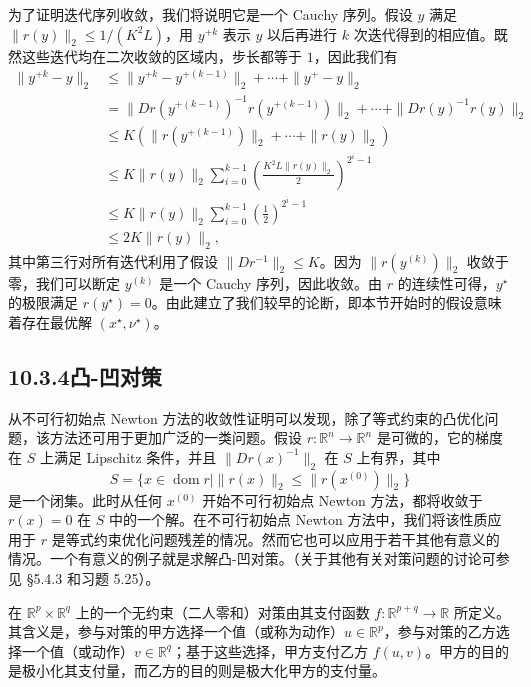 \documentclass[UTF8, 12pt, fontset=fandol, oneside]{ctexart}
\begin{document}
为了证明迭代序列收敛，我们将说明它是一个 Cauchy 序列。假设 $y$ 满足 $\|r(y)\|_2\leq 1/(K^2L)$，用 $y^{+k}$ 表示 $y$ 以后再进行 $k$ 次迭代得到的相应值。既然这些迭代均在二次收敛的区域内，步长都等于 $1$，因此我们有
\[
\begin{aligned}
\|y^{+k}-y\|_2
&\leq \|y^{+k}-y^{+(k-1)}\|_2+\cdots+\|y^+-y\|_2\\
&=\|Dr(y^{+(k-1)})^{-1}r(y^{+(k-1)})\|_2+\cdots+\|Dr(y)^{-1}r(y)\|_2\\
&\leq K\left(\|r(y^{+(k-1)})\|_2+\cdots+\|r(y)\|_2\right)\\
&\leq K\|r(y)\|_2\sum_{i=0}^{k-1}\left(\frac{K^2L\|r(y)\|_2}{2}\right)^{2^i-1}\\
&\leq K\|r(y)\|_2\sum_{i=0}^{k-1}\left(\frac{1}{2}\right)^{2^i-1}\\
&\leq 2K\|r(y)\|_2,
\end{aligned}
\]
其中第三行对所有迭代利用了假设 $\|Dr^{-1}\|_2\leq K$。因为 $\|r(y^{(k)})\|_2$ 收敛于零，我们可以断定 $y^{(k)}$ 是一个 Cauchy 序列，因此收敛。由 $r$ 的连续性可得，$y^\star$ 的极限满足 $r(y^\star)=0$。由此建立了我们较早的论断，即本节开始时的假设意味着存在最优解 $(x^\star,\nu^\star)$。

\subsection*{10.3.4\quad 凸-凹对策}

从不可行初始点 Newton 方法的收敛性证明可以发现，除了等式约束的凸优化问题，该方法还可用于更加广泛的一类问题。假设 $r:\mathbb{R}^n\to\mathbb{R}^n$ 是可微的，它的梯度在 $S$ 上满足 Lipschitz 条件，并且 $\|Dr(x)^{-1}\|_2$ 在 $S$ 上有界，其中
\[
S=\{x\in\operatorname{dom} r\mid \|r(x)\|_2\leq \|r(x^{(0)})\|_2\}
\]
是一个闭集。此时从任何 $x^{(0)}$ 开始不可行初始点 Newton 方法，都将收敛于 $r(x)=0$ 在 $S$ 中的一个解。在不可行初始点 Newton 方法中，我们将该性质应用于 $r$ 是等式约束优化问题残差的情况。然而它也可以应用于若干其他有意义的情况。一个有意义的例子就是求解凸-凹对策。（关于其他有关对策问题的讨论可参见 \S5.4.3 和习题 5.25）。

在 $\mathbb{R}^p\times\mathbb{R}^q$ 上的一个无约束（二人零和）对策由其支付函数 $f:\mathbb{R}^{p+q}\to\mathbb{R}$ 所定义。其含义是，参与对策的甲方选择一个值（或称为动作）$u\in\mathbb{R}^p$，参与对策的乙方选择一个值（或动作）$v\in\mathbb{R}^q$；基于这些选择，甲方支付乙方 $f(u,v)$。甲方的目的是极小化其支付量，而乙方的目的则是极大化甲方的支付量。
\end{document}
